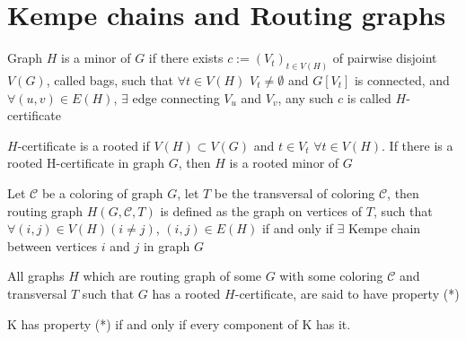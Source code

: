 \chapter{Kempe chains and Routing graphs}

\begin{defn}[H-certificate]
    Graph $H$ is a minor of $G$ if there exists $c := (V_{t})_{t \in V(H)}$ of pairwise disjoint $V(G)$,
     called bags, such that $\forall t \in V(H)$ $V_{t} \neq \emptyset$ and $G[V_{t}]$ is connected, and $\forall (u,v) \in E(H)$,
     $\exists$ edge connecting $V_{u}$ and $V_{v}$, any such $c$ is called $H$-certificate
\end{defn}

\begin{defn}
    $H$-certificate is a rooted if $V(H) \subset V(G)$ and $t \in V_{t}$ $\forall t \in V(H)$. If there is a rooted H-certificate in graph $G$,
    then $H$ is a rooted minor of $G$
\end{defn}

\begin{defn}
Let $\mathcal{C}$ be a coloring of graph $G$, let $T$ be the transversal of coloring $\mathcal{C}$, 
then routing graph $H(G, \mathcal{C}, T)$ is defined as the graph on vertices of $T$, 
such that $\forall (i,j) \in V(H) (i \neq j)$, $(i,j) \in E(H)$ if and only if 
$\exists$ Kempe chain between vertices $i$ and $j$ in graph $G$
\end{defn}

\begin{defn}[Property (*)]
    All graphs $H$ which are routing graph of some $G$ with some coloring $\mathcal{C}$ and transversal $T$
    such that $G$ has a rooted $H$-certificate, are said to have property (*)
\end{defn}

\begin{thm}
    K has property (*) if and only if every component of K has it.
\end{thm}

